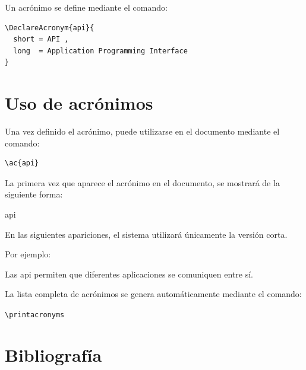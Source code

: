 Un acrónimo se define mediante el comando:

\begin{lstlisting}[caption={Definición de acrónimo},label={code:acronymdef}]
\DeclareAcronym{api}{
  short = API ,
  long  = Application Programming Interface
}
\end{lstlisting}





\section{Uso de acrónimos}

Una vez definido el acrónimo, puede utilizarse
en el documento mediante el comando:

\begin{lstlisting}[caption={Uso de acrónimos},label={code:acronymuse}]
\ac{api}
\end{lstlisting}




La primera vez que aparece el acrónimo en el documento,
se mostrará de la siguiente forma:

\begin{examplebox}
\ac{api}
\end{examplebox}

En las siguientes apariciones, el sistema utilizará
únicamente la versión corta.

Por ejemplo:

\begin{examplebox}
Las \ac{api} permiten que diferentes aplicaciones
se comuniquen entre sí.
\end{examplebox}



\begin{notebox}
La lista completa de acrónimos se genera automáticamente
mediante el comando:

\texttt{\textbackslash printacronyms}
\end{notebox}




\section{Bibliografía}


